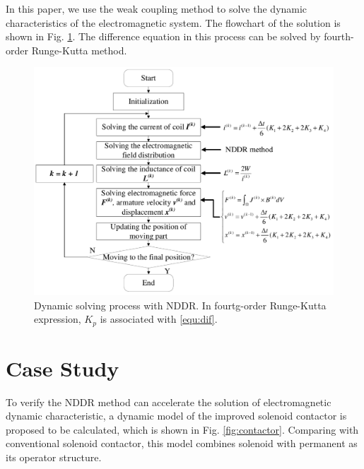 \documentclass[journal,transmag]{IEEEtran}
\begin{document}
In this paper, we use the weak coupling method to solve the dynamic characteristics of the electromagnetic system. The flowchart of the solution is shown in Fig. \ref{fig:flowchart}. The difference equation in this process can be solved by fourth-order Runge-Kutta method.
\begin{figure}
	\centering
	\includegraphics[width=1.0\linewidth]{flowchart2.pdf}
	\caption{Dynamic solving process with NDDR. In fourtg-order Runge-Kutta expression, $K_p$ is associated with \eqref{equ:dif}.}
	\label{fig:flowchart}
\end{figure}

\section{Case Study}
To verify the NDDR method can accelerate the solution of electromagnetic dynamic characteristic, a dynamic model of the improved solenoid contactor is proposed to be calculated, which is shown in Fig. \ref{fig:contactor}. Comparing with conventional solenoid contactor, this model combines solenoid with permanent as its operator structure. 
\end{document}
